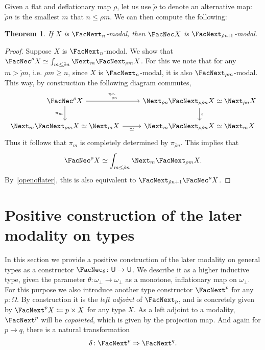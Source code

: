 \documentclass[a4paper,10pt]{amsart}
\newtheorem{theorem}{Theorem}[section]
\theoremstyle{definition}
\newcommand{\ms}[1]{\mathsf{#1}}
\newcommand{\pf}[1]{\widehat{#1}}
\newcommand{\nt}{\Rightarrow}
\newcommand{\ovob}{\omega_\bot}
\newcommand{\bx}{\FacNec}
\newcommand{\Type}{\ms U}
\newcommand{\Prop}{\Omega}
\newcommand{\plo}{\!+\!1}
\newcommand{\opm}[1]{\FacNext_{#1}}
\newcommand{\upm}[1]{\FacNext^{#1}}
\newcommand{\clm}[1]{\Next_{#1}}
\begin{document}
Given a flat and deflationary map $\rho$, let us use $\check\rho$ to denote an alternative map: $\check\rho n$ is the smallest $m$ that $n \le \rho m$. We can then compute the following:

\begin{theorem}
  If $X$ is $\opm n$-modal, then $\bx X$ is $\opm{\check\rho n\plo}$-modal. 
\end{theorem}
\begin{proof}
  Suppose $X$ is $\opm n$-modal. We show that $\bx^\rho X \simeq \int_{m\le\check\rho n}\clm m\opm{\rho m}X$. For this we note that for any $m > \check\rho n$, i.e. $\rho m \ge n$, since $X$ is $\opm n$-modal, it is also $\opm{\rho m}$-modal. This way, by construction the following diagram commutes,
  \[
  \begin{tikzcd}
    \bx^\rho X \ar[r, "\pi_{\pf\rho n}"] \ar[d, "\pi_{m}"'] & \clm{\check\rho n}\opm{\rho\check\rho n}X \simeq \clm{\check\rho n}X \ar[d, "\iota"] \\ 
    \clm{m}\opm{\rho m}X \simeq \clm mX \ar[r, "\simeq"'] & \clm{m}\opm{\rho\check\rho n}X \simeq \clm{m}X
  \end{tikzcd}
  \]
  Thus it follows that $\pi_m$ is completely determined by $\pi_{\pf\rho n}$. This implies that 
  \[ \bx^\rho X \simeq \int_{m\le\check\rho n}\clm m\opm{\rho m}X. \]
  By~\cref{openoflater}, this is also equivalent to $\opm{\check\rho n+1}\bx^\rho X$.
\end{proof}

\section{Positive construction of the later modality on types}

In this section we provide a positive construction of the later modality on general types as a constructor $\bx_\theta \colon \Type \to \Type$. We describe it as a higher inductive type, given the parameter $\theta \colon \ovob \to \ovob$ as a monotone, inflationary map on $\ovob$. For this purpose we also introduce another type constructor $\upm p$ for any $p:\Prop$. By construction it is the \emph{left adjoint} of $\opm p$, and is concretely given by $\upm pX \coloneq p \times X$ for any type $X$. As a left adjoint to a modality, $\upm p$ will be \emph{copointed}, which is given by the projection map. And again for $p \to q$, there is a natural transformation 
\[ \delta \colon \upm p \nt \upm q. \]
\end{document}
